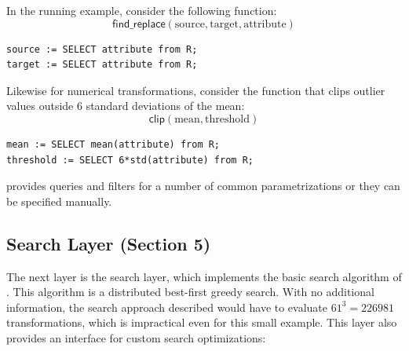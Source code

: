 In the running example, consider the following function:
\[
\textsf{find\_replace}(\text{source}, \text{target}, \text{attribute})
\]
\begin{lstlisting}
source := SELECT attribute from R;
target := SELECT attribute from R;
\end{lstlisting}
Likewise for numerical transformations, consider the function that clips outlier values outside 6 standard deviations of the mean:
\[
\textsf{clip}(\text{mean}, \text{threshold})
\]
\begin{lstlisting}
mean := SELECT mean(attribute) from R;
threshold := SELECT 6*std(attribute) from R;
\end{lstlisting}
\sys provides queries and filters for a number of common parametrizations or they can be specified manually.

\subsection{Search Layer (Section 5)} The next layer is the search layer, which implements the basic search algorithm of \sys. This algorithm is a distributed best-first greedy search.  
With no additional information, the search approach described would have to evaluate $61^3 = 226981$ transformations, which is impractical even for this small example.
This layer also provides an interface for custom search optimizations:
\fi
